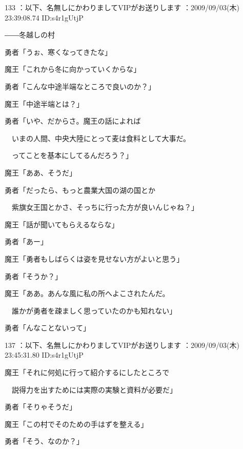 \documentclass[a4j,twocolumn]{tarticle}
\begin{document}
	
    
    

133 ：以下、名無しにかわりましてVIPがお送りします ：2009/09/03(木) 23:39:08.74 ID:s4r1gUtjP 


――冬越しの村 



勇者「うぉ、寒くなってきたな」\par{} 
魔王「これから冬に向かっていくからな」 



勇者「こんな中途半端なところで良いのか？」\par{} 
魔王「中途半端とは？」 



勇者「いや、だからさ。魔王の話によれば\par{} 
　いまの人間、中央大陸にとって麦は食料として大事だ。\par{} 
　ってことを基本にしてるんだろう？」\par{} 
魔王「ああ、そうだ」 



勇者「だったら、もっと農業大国の湖の国とか\par{} 
　紫旗女王国とかさ、そっちに行った方が良いんじゃね？」 



魔王「話が聞いてもらえるならな」\par{} 
勇者「あー」 



魔王「勇者もしばらくは姿を見せない方がよいと思う」\par{} 
勇者「そうか？」 



魔王「ああ。あんな風に私の所へよこされたんだ。\par{} 
　誰かが勇者を疎ましく思っていたのかも知れない」\par{} 
勇者「んなことないって」 

	
    
	

137 ：以下、名無しにかわりましてVIPがお送りします ：2009/09/03(木) 23:45:31.80 ID:s4r1gUtjP


魔王「それに何処に行って紹介するにしたところで\par{} 
　説得力を出すためには実際の実験と資料が必要だ」\par{} 
勇者「そりゃそうだ」 



魔王「この村でそのための手はずを整える」\par{} 
勇者「そう、なのか？」 
\end{document}
